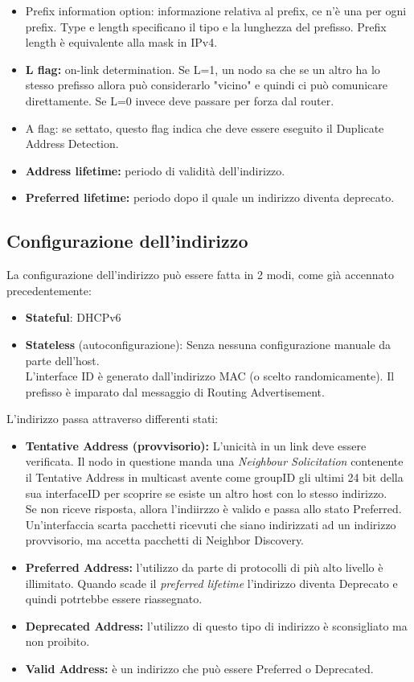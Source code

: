 \documentclass{article}
\begin{document}
\begin{itemize}
    \item Prefix information option: informazione relativa al prefix, ce n'è una per ogni prefix. Type e length specificano il tipo e la lunghezza del prefisso. Prefix length è equivalente alla mask in IPv4.
    \item \textbf{L flag:} on-link determination. Se L=1, un nodo sa che se un altro ha lo stesso prefisso allora può considerarlo "vicino" e quindi ci può comunicare direttamente. Se L=0 invece deve passare per forza dal router.
    \item A flag: se settato, questo flag indica che deve essere eseguito il Duplicate Address Detection.
    \item \textbf{Address lifetime:} periodo di validità dell'indirizzo.
    \item \textbf{Preferred lifetime:} periodo dopo il quale un indirizzo diventa deprecato.
\end{itemize}

\subsection{Configurazione dell'indirizzo}
La configurazione dell'indirizzo può essere fatta in 2 modi, come già accennato precedentemente:
\begin{itemize}
    \item \textbf{Stateful}: DHCPv6
    \item \textbf{Stateless} (autoconfigurazione): Senza nessuna configurazione manuale da parte dell'host. \\ L'interface ID è generato dall'indirizzo MAC (o scelto randomicamente). Il prefisso è imparato dal messaggio di Routing Advertisement.
\end{itemize}
L'indirizzo passa attraverso differenti stati:
\begin{itemize}
    \item \textbf{Tentative Address (provvisorio):} L'unicità in un link deve essere verificata. Il nodo in questione manda una \textit{Neighbour Solicitation} contenente il Tentative Address in multicast avente come groupID gli ultimi 24 bit della sua interfaceID per scoprire se esiste un altro host con lo stesso indirizzo.\\
    Se non riceve risposta, allora l'indiirzzo è valido e passa allo stato Preferred. Un'interfaccia scarta pacchetti ricevuti che siano indirizzati ad un indirizzo provvisorio, ma accetta pacchetti di Neighbor Discovery.
    \item \textbf{Preferred Address:} l'utilizzo da parte di protocolli di più alto livello è illimitato. Quando scade il \textit{preferred lifetime} l'indirizzo diventa Deprecato e quindi potrtebbe essere riassegnato.
    \item \textbf{Deprecated Address:} l'utilizzo di questo tipo di indirizzo è sconsigliato ma non proibito.
    \item \textbf{Valid Address:} è un indirizzo che può essere Preferred o Deprecated.
\end{itemize}
\end{document}
